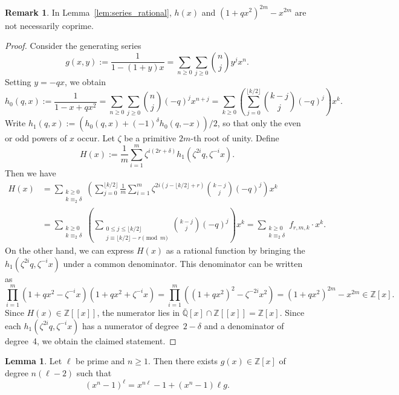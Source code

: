 \documentclass[10pt]{article}
\theoremstyle{definition}
\newtheorem{lemma}[theorem]{Lemma}
\newtheorem{remark}[theorem]{Remark}
\renewcommand{\:}{\colon}
\begin{document}
\begin{remark}
In Lemma~\ref{lem:series_rational}, $h(x)$ and $(1+qx^2)^{2m} - x^{2m}$ are not necessarily coprime.    
\end{remark}

\begin{proof}
Consider the generating series
\[
g(x,y) := \frac{1}{1-(1+y)x} = \sum_{n \geq 0}\sum_{j \geq 0} \binom{n}{j} y^j x^n.
\]
Setting $y = -qx$, we obtain
\[
h_0(q,x) := \frac{1}{1-x+qx^2} = \sum_{n \geq 0} \sum_{j \geq 0} \binom{n}{j} (-q)^j x^{n+j} = \sum_{k \geq 0}\left( \sum_{j=0}^{\lfloor k/2 \rfloor} \binom{k-j}{j} (-q)^j \right) x^k.
\]
Write $h_1(q,x) := (h_0(q,x) + (-1)^{\delta}h_0(q,-x))/2$, so that only the even or odd powers of $x$ occur. Let $\zeta$ be a primitive $2m$-th root of unity. Define
\[
H(x) := \frac{1}{m} \sum_{i=1}^m \zeta^{i(2r+\delta)} h_1(\zeta^{2i}q,\zeta^{-i} x).
\]
Then we have
\begin{align*}
H(x) &= \sum_{\substack{k \geq 0 \\ k\equiv_2 \delta}} \left( \sum_{j = 0}^{\lfloor k/2 \rfloor} \frac{1}{m} \sum_{i = 1}^m \zeta^{2i(j-\lfloor k/2 \rfloor+r)} \binom{k-j}{j} (-q)^j \right) x^{k} \\
&= \sum_{\substack{k \geq 0 \\ k\equiv_2 \delta}} \left( \sum_{\substack{0 \leq j \leq \lfloor k/2 \rfloor \\ j \equiv \lfloor k/2 \rfloor -r \pmod{m}}} \binom{k-j}{j} (-q)^j \right) x^{k} = \sum_{\substack{k \geq 0 \\ k\equiv_2 \delta}} f_{r,m,k} \cdot x^{k}.
\end{align*}
On the other hand, we can express $H(x)$ as a rational function by bringing the $h_1(\zeta^{2i}q,\zeta^{-i}x)$ under a common denominator. This denominator can be written as
\[
\prod_{i=1}^m (1+qx^2-\zeta^{-i}x)(1+qx^2+\zeta^{-i}x) = \prod_{i=1}^m ((1+qx^2)^2 - \zeta^{-2i}x^2) = (1+qx^2)^{2m} - x^{2m} \in \mathbb Z[x].
\]
Since $H(x) \in \mathbb Z[\![x]\!]$, the numerator lies in $\bar{\mathbb Q}[x] \cap \mathbb Z[\![x]\!] = \mathbb Z[x]$. Since each $h_1(\zeta^{2i}q,\zeta^{-i}x)$ has a numerator of degree~$2-\delta$ and a denominator of degree~4, we obtain the claimed statement.
\end{proof}

\begin{lemma}\label{lem:(f-1)^ell}
    Let $\ell$ be prime and $n \geq 1$. Then there exists $g(x) \in \mathbb Z[x]$ of degree $n(\ell-2)$ such that 
    \[
    (x^n-1)^{\ell} = x^{n\ell} - 1 + (x^{n}-1)\ell g.
    \]
\end{lemma}
\end{document}
